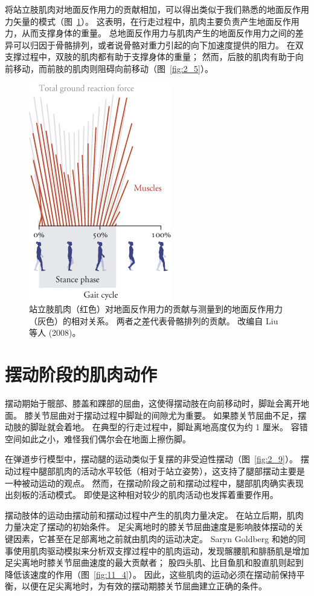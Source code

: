 将站立肢肌肉对地面反作用力的贡献相加，可以得出类似于我们熟悉的地面反作用力矢量的模式（图~\ref{fig:11_3}）。
这表明，在行走过程中，肌肉主要负责产生地面反作用力，从而支撑身体的重量。
总地面反作用力与肌肉产生的地面反作用力之间的差异可以归因于骨骼排列，或者说骨骼对重力引起的向下加速度提供的阻力。
在双支撑过程中，双肢的肌肉都有助于支撑身体的重量；
然而，后肢的肌肉有助于向前移动，而前肢的肌肉则阻碍向前移动（图~\ref{fig:2_5}）。


\begin{figure}[!htb]
	\centering
	\includegraphics[width=0.4\linewidth]{chap11/11_3}
	\caption{站立肢肌肉（红色）对地面反作用力的贡献与测量到的地面反作用力（灰色）的相对关系。
		两者之差代表骨骼排列的贡献。
		改编自 Liu 等人 (2008)。 \label{fig:11_3}}
\end{figure}


\section{摆动阶段的肌肉动作}

摆动期始于髋部、膝盖和踝部的屈曲，这使得摆动肢在向前移动时，脚趾会离开地面。
膝关节屈曲对于摆动过程中脚趾的间隙尤为重要。
如果膝关节屈曲不足，摆动肢的脚趾就会着地。
在典型的行走过程中，脚趾离地高度仅为约 1 厘米。
容错空间如此之小，难怪我们偶尔会在地面上擦伤脚。


在弹道步行模型中，摆动腿的运动类似于复摆的非受迫性摆动（图~\ref{fig:2_9}）。
摆动过程中腿部肌肉的活动水平较低（相对于站立姿势），这支持了腿部摆动主要是一种被动运动的观点。
然而，在摆动阶段之前和摆动过程中，腿部肌肉确实表现出刻板的活动模式。
即使是这种相对较少的肌肉活动也发挥着重要作用。


摆动肢体的运动由摆动前和摆动过程中产生的肌肉力量决定。
在站立后期，肌肉力量决定了摆动的初始条件。
足尖离地时的膝关节屈曲速度是影响肢体摆动的关键因素，它甚至在足部离地之前就由肌肉的运动决定。
Saryn Goldberg 和她的同事使用肌肉驱动模拟来分析双支撑过程中的肌肉运动，发现髂腰肌和腓肠肌是增加足尖离地时膝关节屈曲速度的最大贡献者；
股四头肌、比目鱼肌和股直肌则起到降低该速度的作用（图~\ref{fig:11_4}）。
因此，这些肌肉的运动必须在摆动前保持平衡，以便在足尖离地时，为有效的摆动期膝关节屈曲建立正确的条件。


